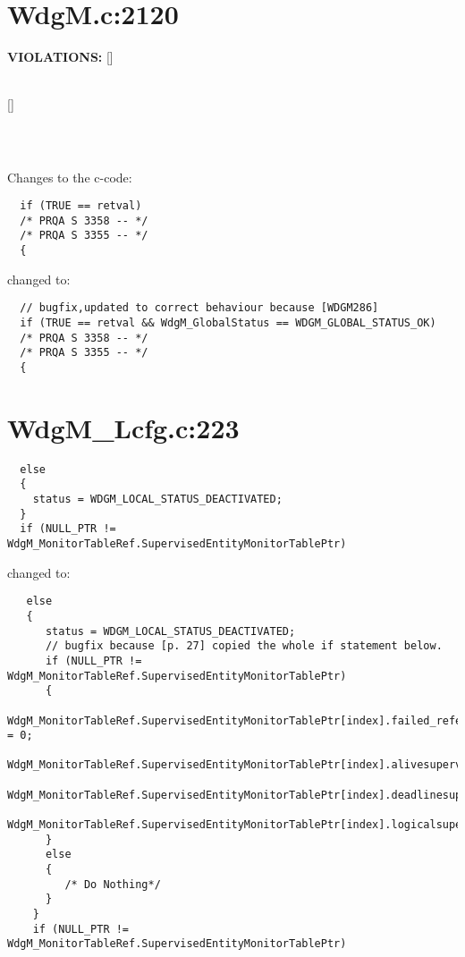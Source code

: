 \documentclass[11pt,a4paper]{article}
\begin{document}
\section{WdgM.c:2120}
\textbf{VIOLATIONS:} []\\[0.5cm]

\lstset{language=autosar}

\\

[]
\begin{lstlisting}
\end{lstlisting}~\\

\lstset{language=c}

Changes to the c-code:
\begin{lstlisting}
  if (TRUE == retval)
  /* PRQA S 3358 -- */
  /* PRQA S 3355 -- */
  {
\end{lstlisting}
changed to:
\begin{lstlisting}
  // bugfix,updated to correct behaviour because [WDGM286]
  if (TRUE == retval && WdgM_GlobalStatus == WDGM_GLOBAL_STATUS_OK)
  /* PRQA S 3358 -- */
  /* PRQA S 3355 -- */
  {
\end{lstlisting}
\newpage

\section{WdgM\_Lcfg.c:223}
\begin{lstlisting}
  else
  {
    status = WDGM_LOCAL_STATUS_DEACTIVATED;
  }
  if (NULL_PTR != WdgM_MonitorTableRef.SupervisedEntityMonitorTablePtr)
\end{lstlisting}
changed to:
\begin{lstlisting}
   else
   {
      status = WDGM_LOCAL_STATUS_DEACTIVATED;
      // bugfix because [p. 27] copied the whole if statement below.
      if (NULL_PTR != WdgM_MonitorTableRef.SupervisedEntityMonitorTablePtr)
      {
         WdgM_MonitorTableRef.SupervisedEntityMonitorTablePtr[index].failed_reference_supervisioncycles = 0;
      WdgM_MonitorTableRef.SupervisedEntityMonitorTablePtr[index].alivesupervision_result=WDGM_CORRECT;
         WdgM_MonitorTableRef.SupervisedEntityMonitorTablePtr[index].deadlinesupervision_result=WDGM_CORRECT;
         WdgM_MonitorTableRef.SupervisedEntityMonitorTablePtr[index].logicalsupervision_result=WDGM_CORRECT;
      }
      else
      {
         /* Do Nothing*/
      }
    }
    if (NULL_PTR != WdgM_MonitorTableRef.SupervisedEntityMonitorTablePtr)
\end{lstlisting}
\end{document}
